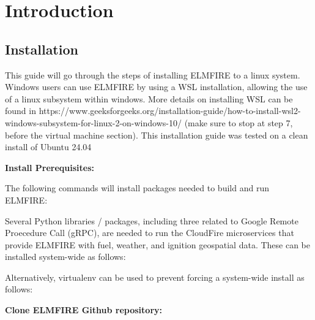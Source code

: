 

\section{Introduction}

\subsection{Installation}
\label{installation}

This guide will go through the steps of installing ELMFIRE to a linux system. Windows users can use ELMFIRE by using a WSL installation, allowing the use of a linux subsystem within windows. More details on installing WSL can be found in https://www.geeksforgeeks.org/installation-guide/how-to-install-wsl2-windows-subsystem-for-linux-2-on-windows-10/ (make sure to stop at step 7, before the virtual machine section). This installation guide was tested on a clean install of Ubuntu 24.04

\textbf{Install Prerequisites:}

The following commands will install packages needed to build and run ELMFIRE:



Several Python libraries / packages, including three related to Google Remote Proecedure Call (gRPC), are needed to run the CloudFire microservices that provide ELMFIRE with fuel, weather, and ignition geospatial data. These can be installed system-wide as follows:


Alternatively, virtualenv can be used to prevent forcing a system-wide install as follows:





\textbf{Clone ELMFIRE Github repository:}

